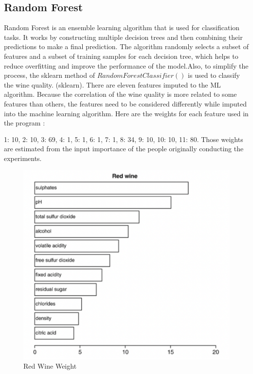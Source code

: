 \documentclass[conference]{IEEEtran}
\begin{document}
\subsection{Random Forest}
Random Forest is an ensemble learning algorithm that is used for classification tasks. It works by constructing multiple decision trees and then combining their predictions to make a final prediction. The algorithm randomly selects a subset of features and a subset of training samples for each decision tree, which helps to reduce overfitting and improve the performance of the model.Also, to simplify the process, the sklearn method of $RandomForestClassifier()$ is used to classify the wine quality. (sklearn). There are eleven features imputed to the ML algorithm. Because the correlation of the wine quality is more related to some features than others, the features need to be considered differently while imputed into the machine learning algorithm. Here are the weights for each feature used in the program :{1: 10, 2: 10, 3: 69, 4: 1, 5: 1, 6: 1, 7: 1, 8: 34, 9: 10, 10: 10, 11: 80.  Those weights are estimated from the input importance of the people originally conducting the experiments.\cite{b4}\\
	\begin{figure}[h]
	\label{fig:foo}
	\begin{center}
	\includegraphics[scale=0.3]{redWineWeight.png}
	\caption{Red Wine Weight}
	\end{center}
	\end{figure}\\

}
\end{document}
